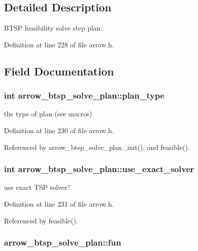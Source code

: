 \subsection{Detailed Description}
BTSP feasibility solve step plan. 

Definition at line 228 of file arrow.h.

\subsection{Field Documentation}
\hypertarget{structarrow__btsp__solve__plan_527ebf95b7a2c12f174d935ded4445a9}{
\subsubsection{\setlength{\rightskip}{0pt plus 5cm}int {\bf arrow\_\-btsp\_\-solve\_\-plan::plan\_\-type}}}
\label{structarrow__btsp__solve__plan_527ebf95b7a2c12f174d935ded4445a9}


the type of plan (see macros) 

Definition at line 230 of file arrow.h.

Referenced by arrow\_\-btsp\_\-solve\_\-plan\_\-init(), and feasible().\hypertarget{structarrow__btsp__solve__plan_fed81dda6e547af712c67dc2c35b55b3}{
\subsubsection{\setlength{\rightskip}{0pt plus 5cm}int {\bf arrow\_\-btsp\_\-solve\_\-plan::use\_\-exact\_\-solver}}}
\label{structarrow__btsp__solve__plan_fed81dda6e547af712c67dc2c35b55b3}


use exact TSP solver? 

Definition at line 231 of file arrow.h.

Referenced by feasible().\hypertarget{structarrow__btsp__solve__plan_89fa2ad1bcc026cd50fd7abc6c30ce3e}{
\subsubsection{ {\bf arrow\_\-btsp\_\-solve\_\-plan::fun}}}
\label{structarrow__btsp__solve__plan_89fa2ad1bcc026cd50fd7abc6c30ce3e}


